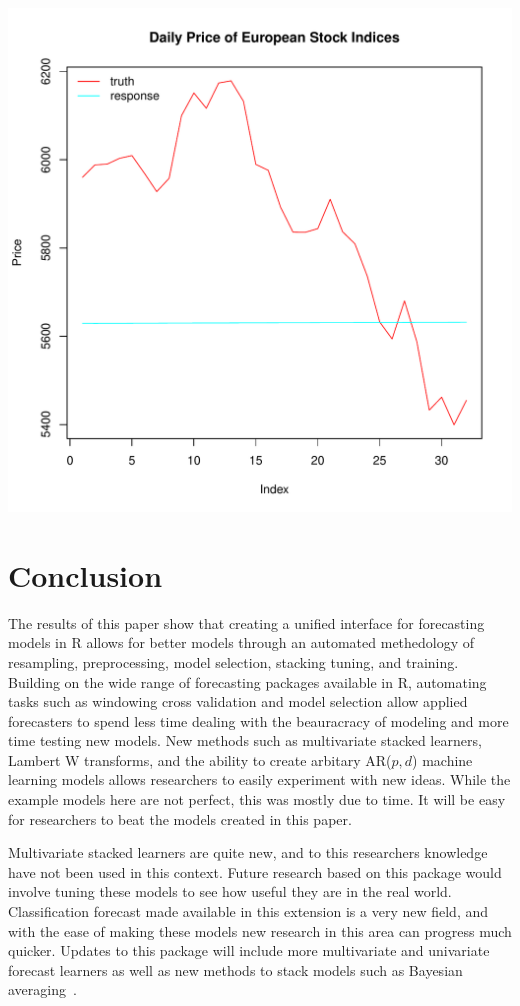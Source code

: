 \documentclass{article}\usepackage[]{graphicx}\usepackage[]{color}
\makeatletter
\def\maxwidth{ %
  \ifdim\Gin@nat@width>\linewidth
    \linewidth
  \else
    \Gin@nat@width
  \fi
}
\newenvironment{knitrout}{}{} %
\theoremstyle{definition}
\let\proglang=\textsf
\makeatother
\begin{document}
\begin{knitrout}
\color{fgcolor}
\includegraphics[width=\maxwidth]{figure/multiForecast8-1} 

\end{knitrout}

\section{Conclusion}

The results of this paper show that creating a unified interface for forecasting models in \proglang{R} allows for better models through an automated methedology of resampling, preprocessing, model selection, stacking tuning, and training. Building on the wide range of forecasting packages available in \proglang{R}, automating tasks such as windowing cross validation and model selection allow applied forecasters to spend less time dealing with the beauracracy of modeling and more time testing new models. New methods such as multivariate stacked learners, Lambert W transforms, and the ability to create arbitary AR($p,d$) machine learning models allows researchers to easily experiment with new ideas. While the example models here are not perfect, this was mostly due to time. It will be easy for researchers to beat the models created in this paper.

Multivariate stacked learners are quite new, and to this researchers knowledge have not been used in this context. Future research based on this package would involve tuning these models to see how useful they are in the real world. Classification forecast made available in this extension is a very new field, and with the ease of making these models new research in this area can progress much quicker. Updates to this package will include more multivariate and univariate forecast learners as well as new methods to stack models such as Bayesian averaging~\cite{bayesianAverage}.

{}

\end{document}
